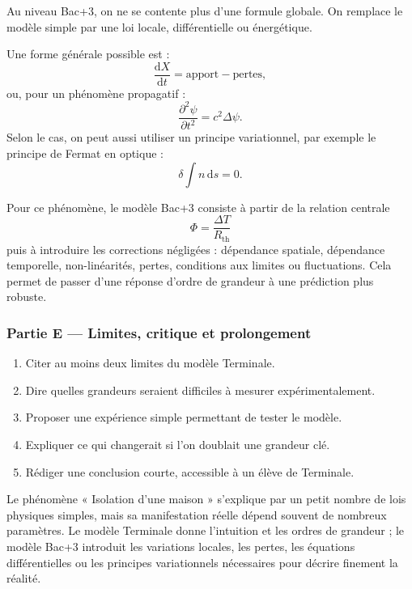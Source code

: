 \documentclass[11pt,a4paper]{article}
\begin{document}
\begin{approfondissementbox}
Au niveau Bac+3, on ne se contente plus d'une formule globale. On remplace le modèle simple par une loi locale, différentielle ou énergétique.

Une forme générale possible est :
\[
\frac{\mathrm d X}{\mathrm dt}=\text{apport}-\text{pertes},
\]
ou, pour un phénomène propagatif :
\[
\frac{\partial^2 \psi}{\partial t^2}=c^2\Delta\psi.
\]
Selon le cas, on peut aussi utiliser un principe variationnel, par exemple le principe de Fermat en optique :
\[
\delta \int n\,\mathrm ds=0.
\]

Pour ce phénomène, le modèle Bac+3 consiste à partir de la relation centrale
\[
\Phi=\frac{\Delta T}{R_{\mathrm{th}}}
\]
puis à introduire les corrections négligées : dépendance spatiale, dépendance temporelle, non-linéarités, pertes, conditions aux limites ou fluctuations. Cela permet de passer d'une réponse d'ordre de grandeur à une prédiction plus robuste.
\end{approfondissementbox}

\subsubsection*{Partie E — Limites, critique et prolongement}

\begin{enumerate}
  \item Citer au moins deux limites du modèle Terminale.
  \item Dire quelles grandeurs seraient difficiles à mesurer expérimentalement.
  \item Proposer une expérience simple permettant de tester le modèle.
  \item Expliquer ce qui changerait si l'on doublait une grandeur clé.
  \item Rédiger une conclusion courte, accessible à un élève de Terminale.
\end{enumerate}

\begin{corrigebox}
Le phénomène « Isolation d'une maison » s'explique par un petit nombre de lois physiques simples, mais sa manifestation réelle dépend souvent de nombreux paramètres. Le modèle Terminale donne l'intuition et les ordres de grandeur ; le modèle Bac+3 introduit les variations locales, les pertes, les équations différentielles ou les principes variationnels nécessaires pour décrire finement la réalité.
\end{corrigebox}
\end{document}
